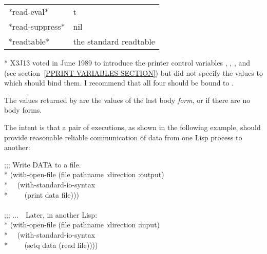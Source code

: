 \begin{defmac}
\begin{table}[t]
\begin{flushleft}
\begin{tabular}{@{}ll@{}}
      {*read-eval*}                    &     t \\
      {*read-suppress*}                &     nil \\
      {*readtable*}                    &     \textrm{the standard readtable}
\end{tabular}
\end{flushleft}
* X3J13 voted in June 1989 
to introduce the printer control variables
,
,
,
and 
(see section~\ref{PPRINT-VARIABLES-SECTION})
but did not specify the values to which 
should bind them.  I recommend that all four should be bound to .
\end{table}

    The values returned by  are the values
    of the last body \emph{form}, or  if there are no body forms.

The intent is that a pair of executions, as shown in the following example,
should provide reasonable reliable communication of data from
one Lisp process to another:
\begin{lisp}
;;; Write DATA to a file. \\*
(with-open-file (file pathname :direction :output) \\*
~~(with-standard-io-syntax \\*
~~~~(print data file))) \\
\\
;;; ...~~Later, in another Lisp: \\*
(with-open-file (file pathname :direction :input) \\*
~~(with-standard-io-syntax \\*
~~~~(setq data (read file))))
\end{lisp}


\end{defmac}
